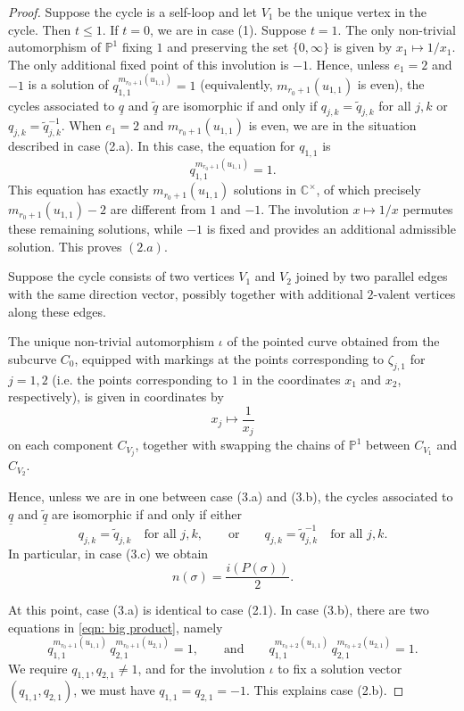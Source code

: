 \documentclass{article}
\begin{document}
\begin{proof}
        Suppose the cycle is a self-loop and let $V_1$ be the unique vertex in the cycle. Then $t \leq 1$. If $t=0$, we are in case (1). Suppose $t=1$. The only non-trivial automorphism of $\mathbb{P}^1$ fixing $1$ and preserving the set $\{0,\infty\}$ is given by $x_1 \mapsto 1/x_1$. The only additional fixed point of this involution is $-1$. Hence, unless $e_1=2$ and $-1$ is a solution of $q_{1,1}^{m_{r_0+1}(u_{1,1})}=1$ (equivalently, $m_{r_0+1}(u_{1,1})$ is even), the cycles associated to $\underline{q}$ and $\widetilde{\underline{q}}$ are isomorphic if and only if $q_{j,k}=\widetilde{q}_{j,k}$ for all $j,k$ or $q_{j,k}=\widetilde{q}^{-1}_{j,k}$. When $e_1=2$ and $m_{r_0+1}(u_{1,1})$ is even, we are in the situation described in case (2.a). In this case, the equation for $q_{1,1}$ is
        \[
            q_{1,1}^{m_{r_0+1}(u_{1,1})}=1.
        \]
        This equation has exactly $m_{r_0+1}(u_{1,1})$ solutions in $\mathbb{C}^\times$, of which precisely $m_{r_0+1}(u_{1,1})-2$ are different from $1$ and $-1$. The involution $x \mapsto 1/x$ permutes these remaining solutions, while $-1$ is fixed and provides an additional admissible solution. This proves $(2.a)$.

        Suppose the cycle consists of two vertices $V_1$ and $V_2$ joined by two parallel edges with the same direction vector, possibly together with additional $2$-valent vertices along these edges.

    The unique non-trivial automorphism $\iota$ of the pointed curve obtained from the subcurve $C_0$, equipped with markings at the points corresponding to $\zeta_{j,1}$ for $j=1,2$ (i.e. the points corresponding to $1$ in the coordinates $x_1$ and $x_2$, respectively), is given in coordinates by
    \[
    x_j \longmapsto \frac{1}{x_j}
    \]
    on each component $C_{V_j}$, together with swapping the chains of $\mathbb{P}^1$ between $C_{V_1}$ and $C_{V_2}$.

    Hence, unless we are in one between case (3.a) and (3.b), 
    the cycles associated to $\underline{q}$ and $\widetilde{\underline{q}}$ are isomorphic if and only if either
    \[
    q_{j,k} = \widetilde{q}_{j,k} \quad \text{for all } j,k,
    \qquad \text{or} \qquad
    q_{j,k} = \widetilde{q}_{j,k}^{-1} \quad \text{for all } j,k.
    \]
    In particular, in case (3.c) we obtain
    \[
        n(\sigma)=\frac{i(P(\sigma))}{2}.
    \]

    At this point, case (3.a) is identical to case (2.1). In case (3.b), there are two equations in \eqref{eqn: big product}, namely
    \[
        q_{1,1}^{m_{r_0+1}(u_{1,1})} \, q_{2,1}^{m_{r_0+1}(u_{2,1})}=1,
        \qquad \text{and} \qquad
        q_{1,1}^{m_{r_0+2}(u_{1,1})} \, q_{2,1}^{m_{r_0+2}(u_{2,1})}=1.
    \]
    We require $q_{1,1}, q_{2,1} \neq 1$, and for the involution $\iota$ to fix a solution vector $(q_{1,1},q_{2,1})$, we must have $q_{1,1}=q_{2,1}=-1$. This explains case (2.b).
\end{proof}
\end{document}
